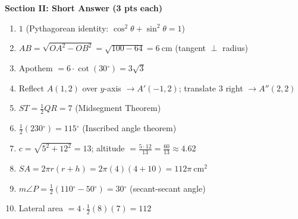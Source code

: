 \documentclass[12pt,addpoints]{exam}
\newcommand{\deg}{{}^\circ}
\begin{document}
\vspace{0.5cm}
\noindent\textbf{Section II: Short Answer (3 pts each)}
\begin{enumerate}[label=\arabic*.]
  \item $1$ (Pythagorean identity: $\cos^2\theta + \sin^2\theta = 1$)
  \item $AB = \sqrt{OA^2 - OB^2} = \sqrt{100 - 64} = \boxed{6~\text{cm}}$ (tangent $\perp$ radius)
  \item Apothem $= 6 \cdot \cot(30\deg) = \boxed{3\sqrt{3}}$
  \item Reflect $A(1,2)$ over $y$-axis $\to A'(-1,2)$; translate $3$ right $\to \boxed{A''(2,2)}$
  \item $ST = \frac{1}{2}QR = \boxed{7}$ (Midsegment Theorem)
  \item $\frac{1}{2}(230\deg) = \boxed{115\deg}$ (Inscribed angle theorem)
  \item $c = \sqrt{5^2+12^2} = 13$; altitude $= \frac{5 \cdot 12}{13} = \boxed{\frac{60}{13} \approx 4.62}$
  \item $SA = 2\pi r(r+h) = 2\pi(4)(4+10) = \boxed{112\pi}~\text{cm}^2$
  \item $m\angle P = \frac{1}{2}(110\deg - 50\deg) = \boxed{30\deg}$ (secant-secant angle)
  \item Lateral area $= 4 \cdot \frac{1}{2}(8)(7) = \boxed{112}$
\end{enumerate}
\end{document}
